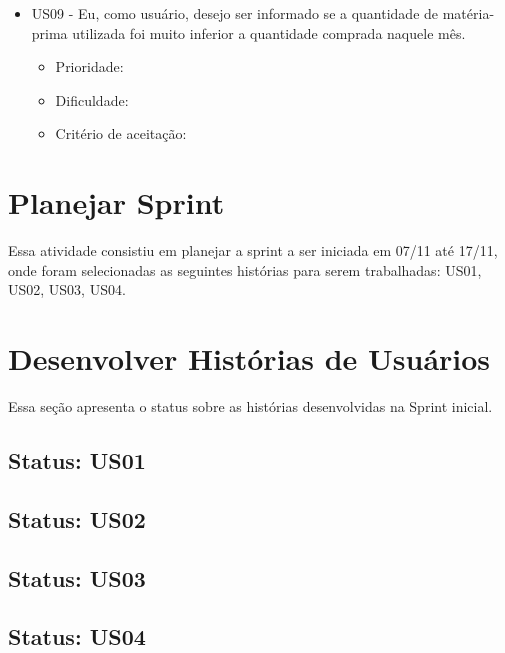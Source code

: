 \begin{itemize}

\item US09 - Eu, como usuário, desejo ser informado se a quantidade de matéria-prima utilizada foi muito inferior a quantidade comprada naquele mês.
    \begin{itemize}
    \item Prioridade:
    \item Dificuldade:
    \item Critério de aceitação:
    \end{itemize}


\end{itemize}


\section{Planejar Sprint}
Essa atividade consistiu em planejar a sprint a ser iniciada em 07/11 até 17/11, onde foram selecionadas as seguintes histórias para serem trabalhadas: US01, US02, US03, US04.

\section{Desenvolver Histórias de Usuários}
Essa seção apresenta o status sobre as histórias desenvolvidas na Sprint inicial.

\subsection{Status: US01}

\subsection{Status: US02}

\subsection{Status: US03}

\subsection{Status: US04}
